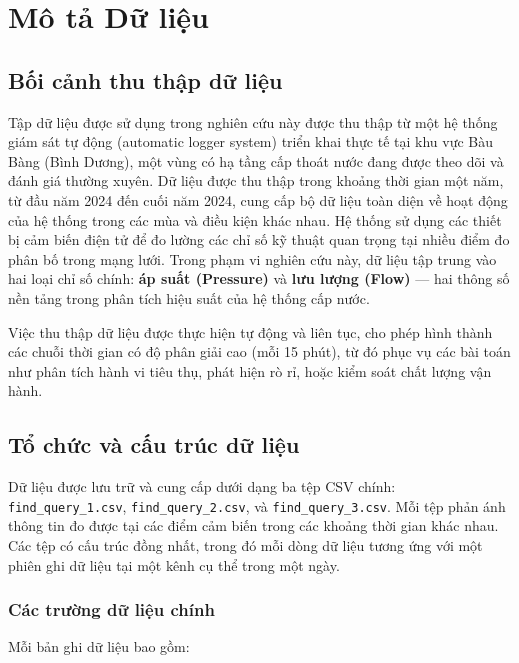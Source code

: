 \section{Mô tả Dữ liệu}

\subsection{Bối cảnh thu thập dữ liệu}

Tập dữ liệu được sử dụng trong nghiên cứu này được thu thập từ một hệ thống giám sát tự động (automatic logger system) triển khai thực tế tại khu vực Bàu Bàng (Bình Dương), một vùng có hạ tầng cấp thoát nước đang được theo dõi và đánh giá thường xuyên. Dữ liệu được thu thập trong khoảng thời gian một năm, từ đầu năm 2024 đến cuối năm 2024, cung cấp bộ dữ liệu toàn diện về hoạt động của hệ thống trong các mùa và điều kiện khác nhau. Hệ thống sử dụng các thiết bị cảm biến điện tử để đo lường các chỉ số kỹ thuật quan trọng tại nhiều điểm đo phân bố trong mạng lưới. Trong phạm vi nghiên cứu này, dữ liệu tập trung vào hai loại chỉ số chính: \textbf{áp suất (Pressure)} và \textbf{lưu lượng (Flow)} — hai thông số nền tảng trong phân tích hiệu suất của hệ thống cấp nước.

Việc thu thập dữ liệu được thực hiện tự động và liên tục, cho phép hình thành các chuỗi thời gian có độ phân giải cao (mỗi 15 phút), từ đó phục vụ các bài toán như phân tích hành vi tiêu thụ, phát hiện rò rỉ, hoặc kiểm soát chất lượng vận hành.

\subsection{Tổ chức và cấu trúc dữ liệu}

Dữ liệu được lưu trữ và cung cấp dưới dạng ba tệp CSV chính: \texttt{find\_query\_1.csv}, \texttt{find\_query\_2.csv}, và \texttt{find\_query\_3.csv}. Mỗi tệp phản ánh thông tin đo được tại các điểm cảm biến trong các khoảng thời gian khác nhau. Các tệp có cấu trúc đồng nhất, trong đó mỗi dòng dữ liệu tương ứng với một phiên ghi dữ liệu tại một kênh cụ thể trong một ngày.

\subsubsection{Các trường dữ liệu chính}

Mỗi bản ghi dữ liệu bao gồm:

